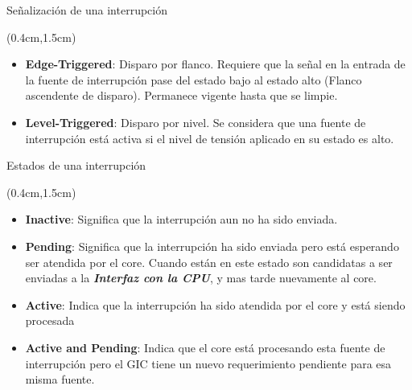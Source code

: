 \documentclass[table,x11names,aspectratio=169]{beamer}
\begin{document}
\begin{frame}[t]{Señalización de una interrupción}
 \begin{textblock*}{\textwidth}(0.4cm,1.5cm)
  \begin{itemize}[<+(1)->]\justifying \parskip 0.4cm
   \item \textbf{\color{Blue1}Edge-Triggered}: Disparo por flanco. Requiere que la señal en la entrada de la fuente de interrupción pase del estado bajo al estado alto (Flanco ascendente de disparo). Permanece vigente hasta que se limpie.
   \item \textbf{\color{Blue3}Level-Triggered}: Disparo por nivel. Se considera que una fuente de interrupción está activa si el nivel de tensión aplicado en su estado es alto.
  \end{itemize}
 \end{textblock*}
\end{frame}

\begin{frame}[t]{Estados de una interrupción}
 \begin{textblock*}{\textwidth}(0.4cm,1.5cm)
  \begin{itemize}[<+(1)->]\justifying \parskip 0.4cm
   \item \textbf{\color{Blue1}Inactive}: Significa que la interrupción aun no ha sido enviada.
   \item \textbf{\color{Blue2}Pending}: Significa que la interrupción ha sido enviada pero está esperando ser atendida por el core. Cuando están en este estado son candidatas a ser enviadas a la \textit{\textbf{Interfaz con la CPU}}, y mas tarde nuevamente al core.
   \item \textbf{\color{Blue3}Active}: Indica que la interrupción ha sido atendida por el core y está siendo procesada
   \item \textbf{\color{Blue4}Active and Pending}: Indica que el core está procesando esta fuente de interrupción pero el GIC tiene un nuevo requerimiento pendiente para esa misma fuente.
  \end{itemize}   
 \end{textblock*}
\end{frame}
\end{document}
